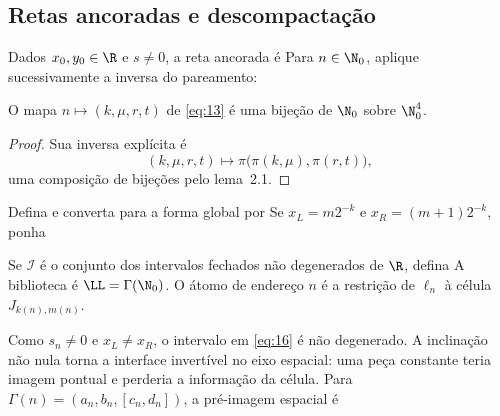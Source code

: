 \subsection{Retas ancoradas e descompactação}
Dados $x_0,y_0\in\R$ e $s\ne0$, a reta ancorada é
Para $n\in\N_0$, aplique sucessivamente a inversa do pareamento:
\begin{lema}
O mapa $n\mapsto(k,\mu,r,t)$ de \eqref{eq:13} é uma bijeção de $\N_0$ sobre $\N_0^4$.
\end{lema}
\begin{proof}
Sua inversa explícita é
\[
(k,\mu,r,t)\longmapsto\pi\bigl(\pi(k,\mu),\pi(r,t)\bigr),
\]
uma composição de bijeções pelo lema~2.1.
\end{proof}
Defina
e converta para a forma global por
Se $x_L=m2^{-k}$ e $x_R=(m+1)2^{-k}$, ponha
\begin{definicao}
Se $\mathcal I$ é o conjunto dos intervalos fechados não degenerados de $\R$, defina
A biblioteca é $\LL=\Gamma(\N_0)$. O átomo de endereço $n$ é a restrição de $\ell_n$ à célula $J_{k(n),m(n)}$.
\end{definicao}
Como $s_n\ne0$ e $x_L\ne x_R$, o intervalo em \eqref{eq:16} é não degenerado. A inclinação não nula torna a interface invertível no eixo espacial: uma peça constante teria imagem pontual e perderia a informação da célula. Para $\Gamma(n)=(a_n,b_n,[c_n,d_n])$, a pré-imagem espacial é

